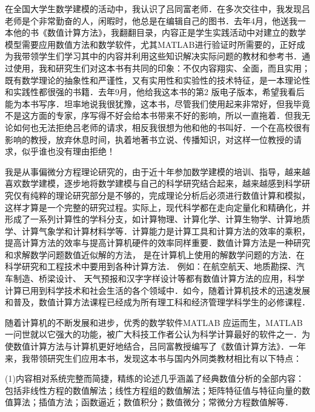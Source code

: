  \vspace*{0.0cm}
\thispagestyle{empty}
\vspace*{0.5cm}
\centerline{\hei{\color{darkblue}{序}}}\vspace{40pt}

在全国大学生数学建模的活动中，我认识了吕同富老师．在多次交往中，我发现吕老师是个非常勤奋的人，闲暇时，他总是在编辑自己的图书．去年4月，他送我一本他的书《数值计算方法》，我翻翻目录，内容正是学生实践活动中对建立的数学模型需要应用数值方法和数学软件，尤其MATLAB进行验证时所需要的，正好成为我带领学生们学习其中的内容并利用这些知识解决实际问题的教材和参考书．通过使用，我和研究生们对这本书有共同的印象：不仅内容翔实、全面，而且实用；既有数学理论的抽象性和严谨性，又有实用性和实验性的技术特征，是一本理论性和实践性都很强的书籍．去年9月，他给我这本书的第2 版电子版本，希望我看后能为本书写序．坦率地说我很犹豫，这本书，尽管我们使用起来非常好，但我毕竟不是这方面的专家，序写得不好会给本书带来不好的影响，所以一直拖着．但我无论如何也无法拒绝吕老师的请求，相反我很想为他和他的书叫好．一个在高校很有影响的教授，放弃休息时间，执着地著书立说、传播知识，对这样一位教授的请求，似乎谁也没有理由拒绝！

我是从事偏微分方程理论研究的，由于近十年参加数学建模的培训、指导，越来越喜欢数学建模，逐步地将数学建模与自己的科学研究结合起来，越来越感到科学研究仅有纯粹的理论研究部分是不够的，完成理论分析后必须进行数值计算和模拟，这样才算是一个完整的研究过程。实际上，现代科学都在走向定量化和精确化，并形成了一系列计算性的学科分支，如计算物理、计算化学、计算生物学、计算地质学、计算气象学和计算材料学等．计算能力是计算工具和计算方法的效率的乘积，提高计算方法的效率与提高计算机硬件的效率同样重要．数值计算方法是一种研究和求解数学问题数值近似解的方法， 是在计算机上使用的解数学问题的方法．在科学研究和工程技术中要用到各种计算方法． 例如：在航空航天、地质勘探、汽车制造、桥梁设计、 天气预报和汉字字样设计等都有数值计算方法的应用，科学计算已用到科学技术和社会生活的各个领域中．如今，随着计算机技术的迅速发展和普及，数值计算方法课程已经成为所有理工科和经济管理学科学生的必修课程．

随着计算机的不断发展和进步，优秀的数学软件MATLAB 应运而生，MATLAB一问世就以它强大的功能，被广大科技工作者公认为科学计算最好的软件之一．为使数值计算方法与计算机更好地结合，吕同富教授编写了《数值计算方法》．一年来，我带领研究生们应用本书，发现这本书与国内外同类教材相比有以下特点：

(1)内容相对系统完整而简捷，精练的论述几乎涵盖了经典数值分析的全部内容：包括非线性方程的数值解法；线性方程组的数值解法；矩阵特征值与特征向量的数值算法；插值方法；函数逼近；数值积分；数值微分；常微分方程数值解等．

